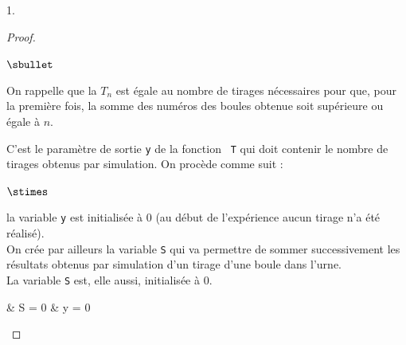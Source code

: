 \begin{noliste}{1.}
    \begin{proof}~
      \begin{noliste}{$\sbullet$}
      \item On rappelle que la \var $T_n$ est égale au nombre de tirages
        nécessaires pour que, pour la première fois, la somme des
        numéros des boules obtenue soit supérieure ou égale à $n$.

      \item C'est le paramètre de sortie {\tt y} de la fonction {\tt
          T} qui doit contenir le nombre de tirages obtenus par
        simulation. On procède comme suit :
        \begin{noliste}{$\stimes$}
        \item la variable {\tt y} est initialisée à $0$ (au
          début de l'expérience aucun tirage n'a été réalisé).\\
          On crée par ailleurs la variable {\tt S} qui va permettre de
          sommer successivement les résultats obtenus par simulation
          d'un tirage d'une boule dans l'urne.\\
          La variable {\tt S} est, elle aussi, initialisée à 
	  $0$.\\[-.2cm]
          \begin{scilabC}{1}
            & \qquad S = 0 \nl %
            & \qquad y = 0 \nl %
          \end{scilabC}


\end{noliste}
\end{noliste}
\end{proof}
\end{noliste}
